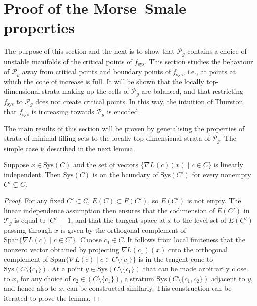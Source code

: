 \section{Proof of the Morse--Smale properties}
\label{mainproof}

The purpose of this section and the next is to show that $\mathcal{P}_{g}$ contains a choice of unstable manifolds of the critical points of $f_{\mathrm{sys}}$. This section studies the behaviour of $\mathcal{P}_{g}$ away from critical points and boundary points of $f_{\mathrm{sys}}$, i.e., at points at which the cone of increase is full. It will be shown that the locally top-dimensional strata making up the cells of $\mathcal{P}_{g}$ are balanced, and that restricting $f_{\mathrm{sys}}$ to $\mathcal{P}_{g}$ does not create critical points. In this way, the intuition of Thurston that $f_{\mathrm{sys}}$ is increasing towards $\mathcal{P}_{g}$ is encoded.

The main results of this section will be proven by generalising the properties of strata of minimal filling sets to the locally top-dimensional strata of $\mathcal{P}_{g}$. The simple case is described in the next lemma.

\begin{Lemma}
\label{linearlyindependent}
Suppose $x\in \mathrm{Sys}(C)$ and the set of vectors $\{\nabla L(c)(x) \mid c\in C\}$ is linearly independent. Then $\mathrm{Sys}(C)$ is on the boundary of $\mathrm{Sys}(C')$ for every nonempty $C'\subsetneq C$.
\end{Lemma}
\begin{proof}
For any fixed $C'\subset C$, $E(C)\subset E(C')$, so $E(C')$ is not empty. The linear independence assumption then ensures that the codimension of $E(C')$ in $\mathcal{T}_{g}$ is equal to $|C'|-1$, and that the tangent space at $x$ to the level set of $E(C')$ passing through $x$ is given by the orthogonal complement of $\mathrm{Span}\{\nabla L(c) \mid c\in C'\}$. Choose $c_{1}\in C$. It follows from local finiteness that the nonzero vector obtained by projecting $\nabla L(c_{1})(x)$ onto the orthogonal complement of $\mathrm{Span}\{\nabla L(c) \mid c\in C\setminus \{c_{1}\}\}$ is in the tangent cone to $\mathrm{Sys}(C\setminus\{c_{1}\})$. At a point $y\in \mathrm{Sys}(C\setminus\{c_{1}\})$ that can be made arbitrarily close to $x$, for any choice of $c_{2}\in (C\setminus\{c_{1}\})$, a stratum $\mathrm{Sys}(C\setminus\{c_{1},c_{2}\})$ adjacent to $y$, and hence also to $x$, can be constructed similarly. This construction can be iterated to prove the lemma.
\end{proof}

